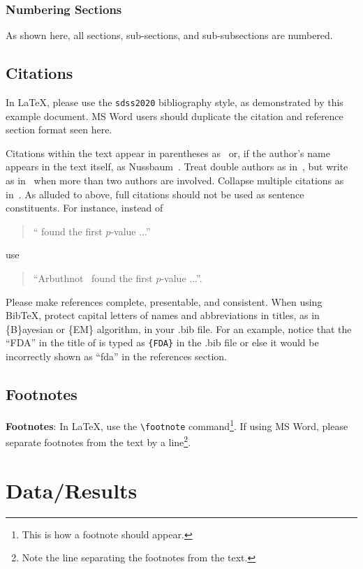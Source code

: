 \documentclass[10pt]{article}
\begin{document}
\subsubsection{Numbering Sections}
As shown here, all sections, sub-sections, and sub-subsections are numbered.

\subsection{Citations}

In \LaTeX, please use the
{\tt sdss2020} bibliography style, as demonstrated by this example document.  
MS Word users should duplicate the citation and reference section format seen here.  

Citations within the text appear in parentheses
as~\cite{Nussbaum2018} or, if the author's name appears in the text
itself, as Nussbaum~.  Treat double authors as
in~\cite{Wasserstein2016}, but write as in~\cite{Brunner} when more than two
authors are involved. Collapse multiple citations as
in~\cite{LaVange2019,Wasserstein2016}.  As alluded to above, full citations should not
be used as sentence constituents.  For instance, instead of
\begin{quote}
  ``\cite{Arbuthnot1710} found the first $p$-value ...''
\end{quote}
use
\begin{quote}
``Arbuthnot~ found the first $p$-value ...''.
\end{quote}
Please make references complete, presentable, and
consistent. When using Bib\TeX, protect capital letters of names and
abbreviations in titles, as in \{B\}ayesian or \{EM\} algorithm, 
in your .bib file.  For an example, notice that the ``FDA'' in 
the title of \cite{LaVange2019} is typed as \verb+{FDA}+ in the .bib file
or else it would be incorrectly shown as ``fda'' in the references section.


\subsection{Footnotes}

{\bf Footnotes}: In \LaTeX, use the \verb+\footnote+ 
command\footnote{This is how a footnote should appear.}. If using
MS Word, please separate footnotes
from the text by a line\footnote{Note the line
separating the footnotes from the text.}.

\section{Data/Results}
\end{document}

